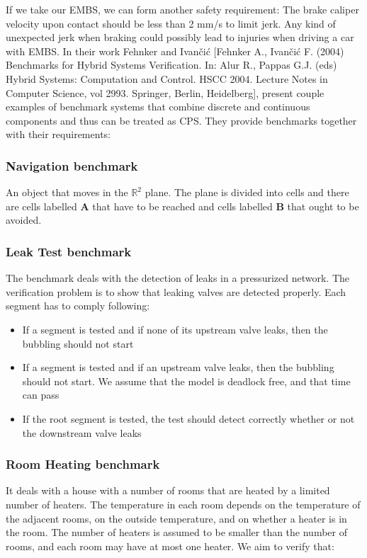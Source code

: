 If we take our EMBS, we can form another safety requirement: The brake caliper velocity upon contact should be less than 2 mm/s to limit jerk. Any kind of unexpected jerk when braking could possibly lead to injuries when driving a car with EMBS. In their work Fehnker and Ivančić [Fehnker A., Ivančić F. (2004) Benchmarks for Hybrid Systems Verification. In: Alur R., Pappas G.J. (eds) Hybrid Systems: Computation and Control. HSCC 2004. Lecture Notes in Computer Science, vol 2993. Springer, Berlin, Heidelberg], present couple examples of benchmark systems that combine discrete and continuous components and thus can be treated as CPS. They provide benchmarks together with their requirements:

\subsubsection{Navigation benchmark}

An object that moves in the ${\mathbb{R}}^2$ plane. The plane is divided into cells and there are cells labelled \textbf{A} that have to be reached and cells labelled \textbf{B} that ought to be avoided.

\subsubsection{Leak Test benchmark}

The benchmark deals with the detection of leaks in a pressurized network. The verification problem is to show that leaking valves are detected properly. Each segment has to comply following:

\begin{itemize}
	\item If a segment is tested and if none of its upstream valve leaks, then the bubbling should not start
	\item If a segment is tested and if an upstream valve leaks, then the bubbling should not start. We assume that the model is deadlock free, and that time can pass
	\item If the root segment is tested, the test should detect correctly whether or not the downstream valve leaks
\end{itemize}

\subsubsection{Room Heating benchmark}

It deals with a house with a number of rooms that are heated by a limited number of heaters. The temperature in each room depends on the temperature of the adjacent rooms, on the outside temperature, and on whether a heater is in the room. The number of heaters is assumed to be smaller than the number of rooms, and each room may have at most one heater. We aim to verify that:

